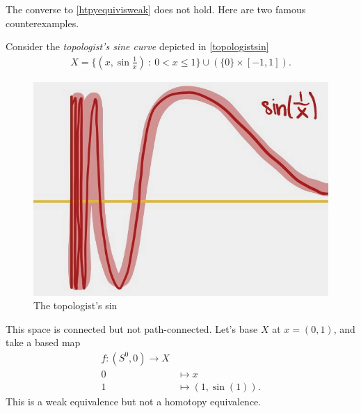 \documentclass{article}[11pt]
\begin{document}
The converse to \autoref{htpyequivisweak} does not hold. Here are two famous counterexamples.
\begin{example} Consider the \textit{topologist's sine curve} depicted in \autoref{topologistsin}
\begin{align*}
	X = \{ (x,\sin\frac{1}{x}) \ : \ 0<x \leq 1\} \cup (\{0\}\times[-1,1]).
\end{align*}

\begin{figure}[h]
  \includegraphics[scale=.2]{pics/topologist_sin.png}
  \centering
  \caption{The topologist's sin}
  \label{topologistsin}
\end{figure}

This space is connected but not path-connected. Let's base $X$ at $x = (0,1)$, and take a based map
\begin{align*}
	f \colon (S^0,0) \to X \\
	0 &\mapsto x \\
	1&\mapsto (1,\sin(1)).
\end{align*}
This is a weak equivalence but not a homotopy equivalence.
\end{example}
\end{document}
